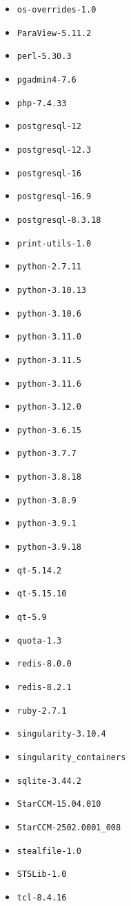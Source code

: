 \begin{multicols}{3}
\begin{itemize}
\item \verb|os-overrides-1.0|
\item \verb|ParaView-5.11.2|
\item \verb|perl-5.30.3|
\item \verb|pgadmin4-7.6|
\item \verb|php-7.4.33|
\item \verb|postgresql-12|
\item \verb|postgresql-12.3|
\item \verb|postgresql-16|
\item \verb|postgresql-16.9|
\item \verb|postgresql-8.3.18|
\item \verb|print-utils-1.0|
\item \verb|python-2.7.11|
\item \verb|python-3.10.13|
\item \verb|python-3.10.6|
\item \verb|python-3.11.0|
\item \verb|python-3.11.5|
\item \verb|python-3.11.6|
\item \verb|python-3.12.0|
\item \verb|python-3.6.15|
\item \verb|python-3.7.7|
\item \verb|python-3.8.18|
\item \verb|python-3.8.9|
\item \verb|python-3.9.1|
\item \verb|python-3.9.18|
\item \verb|qt-5.14.2|
\item \verb|qt-5.15.10|
\item \verb|qt-5.9|
\item \verb|quota-1.3|
\item \verb|redis-8.0.0|
\item \verb|redis-8.2.1|
\item \verb|ruby-2.7.1|
\item \verb|singularity-3.10.4|
\item \verb|singularity_containers|
\item \verb|sqlite-3.44.2|
\item \verb|StarCCM-15.04.010|
\item \verb|StarCCM-2502.0001_008|
\item \verb|stealfile-1.0|
\item \verb|STSLib-1.0|
\item \verb|tcl-8.4.16|

\end{itemize}
\end{multicols}
